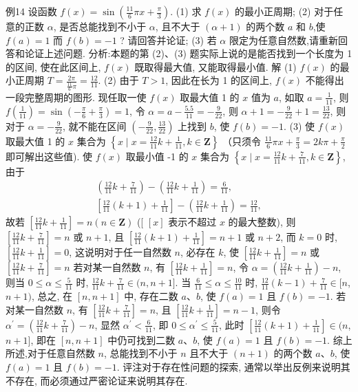 例14 设函数 $f(x)=\sin \left(\frac{11}{6} \pi x+\frac{\pi}{3}\right)$.
(1) 求 $f(x)$ 的最小正周期;
(2) 对于任意的正数 $\alpha$, 是否总能找到不小于 $\alpha$, 且不大于 $(\alpha+1)$ 的两个数 $a$ 和 $b$,使 $f(a)=1$ 而 $f(b)=-1$ ? 请回答并论证;
(3) 若 $\alpha$ 限定为任意自然数,请重新回答和论证上述问题.
分析:本题的第 (2)、(3) 题实际上说的是能否找到一个长度为 1 的区间, 使在此区间上, $f(x)$ 既取得最大值, 又能取得最小值.
解 (1) $f(x)$ 的最小正周期 $T=\frac{2 \pi}{\frac{11}{6} \pi}=\frac{12}{11}$.
(2) 由于 $T>1$, 因此在长为 1 的区间上, $f(x)$ 不能得出一段完整周期的图形.
现任取一使 $f(x)$ 取最大值 1 的 $x$ 值为 $a$, 如取 $a=\frac{1}{11}$, 则 $f\left(\frac{1}{11}\right)=\sin \left(-\frac{\pi}{6}+\frac{\pi}{3}\right)=1$, 令 $\alpha=a-\frac{5.5}{11}=-\frac{9}{22}$, 则 $\alpha+1=-\frac{9}{22}+1=\frac{13}{22}$, 则对于 $\alpha=-\frac{9}{22}$, 就不能在区间 $\left(-\frac{9}{22}, \frac{13}{22}\right)$ 上找到 $b$, 使 $f(b)=-1$.
(3) 使 $f(x)$ 取最大值 1 的 $x$ 集合为 $\left\{x \mid x=\frac{12}{11} k+\frac{1}{11}, k \in \mathbf{Z}\right\}$ （只须令 $\frac{11}{6} \pi x+\frac{\pi}{3}=2 k \pi+\frac{\pi}{2}$ 即可解出这些值).
使 $f(x)$ 取最小值 -1 的 $x$ 集合为 $\left\{x \mid x=\frac{12}{11} k+\frac{7}{11}, k \in \mathbf{Z}\right\}$, 由于
$$
\begin{gathered}
\left(\frac{12}{11} k+\frac{7}{11}\right)-\left(\frac{12}{11} k+\frac{1}{11}\right)=\frac{6}{11}, \\
{\left[\frac{12}{11}(k+1)+\frac{1}{11}\right]-\left(\frac{12}{11} k+\frac{1}{11}\right)=\frac{12}{11},}
\end{gathered}
$$
故若 $\left[\frac{12}{11} k+\frac{1}{11}\right]=n(n \in \mathbf{Z})$ ([ $[x]$ 表示不超过 $x$ 的最大整数), 则 $\left[\frac{12}{11} k+\frac{7}{11}\right]=n$ 或 $n+1$, 且 $\left[\frac{12}{11}(k+1)+\frac{1}{11}\right]=n+1$ 或 $n+2$, 而 $k=0$ 时, $\left[\frac{12}{11} k+\frac{1}{11}\right]=0$, 这说明对于任一自然数 $n$, 必存在 $k$, 使 $\left[\frac{12}{11} k+\frac{1}{11}\right]=n$ 或 $\left[\frac{12}{11} k+\frac{7}{11}\right]=n$
若对某一自然数 $n$, 有 $\left[\frac{12}{11} k+\frac{1}{11}\right]=n$, 令 $\alpha=\left(\frac{12}{11} k+\frac{1}{11}\right)-n$, 则当 $0 \leqslant \alpha \leqslant \frac{5}{11}$ 时, $\frac{12}{11} k+\frac{7}{11} \in(n, n+1]$. 当 $\frac{6}{11} \leqslant \alpha \leqslant \frac{10}{11}$ 时, $\frac{12}{11}(k-1)+\frac{7}{11} \in[n$, $n+1)$, 总之, 在 $[n, n+1]$ 中, 存在二数 $a 、 b$, 使 $f(a)=1$ 且 $f(b)=-1$.
若对某一自然数 $n$, 有 $\left[\frac{12}{11} k+\frac{7}{11}\right]=n$, 且 $\left[\frac{12}{11} k+\frac{1}{11}\right]=n-1$, 则令 $\alpha^{\prime}= \left(\frac{12}{11} k+\frac{7}{11}\right)-n$, 显然 $\alpha^{\prime}<\frac{6}{11}$, 即 $0 \leqslant \alpha^{\prime} \leqslant \frac{5}{11}$, 此时 $\left[\frac{12}{11}(k+1)+\frac{1}{11}\right] \in(n$, $n+1]$, 即在 $[n, n+1]$ 中仍可找到二数 $a 、 b$, 使 $f(a)=1$ 且 $f(b)=-1$.
综上所述,对于任意自然数 $n$, 总能找到不小于 $n$ 且不大于 $(n+1)$ 的两个数 $a 、 b$, 使 $f(a)=1$ 且 $f(b)=-1$.
评注对于存在性问题的探索, 通常以举出反例来说明其不存在, 而必须通过严密论证来说明其存在.



